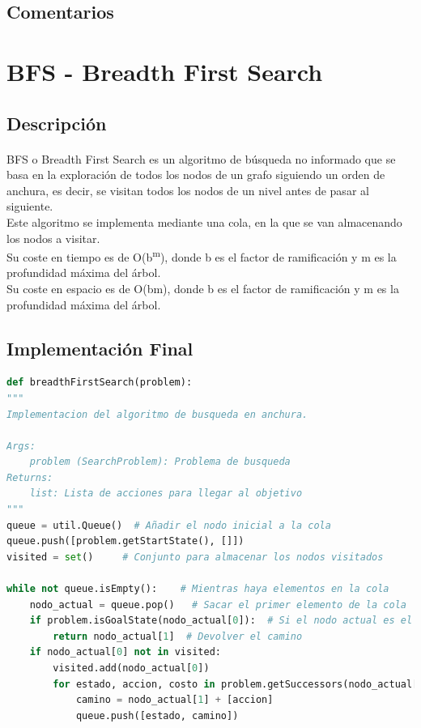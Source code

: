 \documentclass{report}
\begin{document}
        \subsection*{Comentarios}
          \paragraph*{}{

          }
      \clearpage\section{BFS - Breadth First Search}
        \subsection*{Descripción}
          \paragraph*{}{
            BFS o Breadth First Search es un algoritmo de búsqueda no informado que se basa en la exploración de todos los nodos de un grafo siguiendo un orden de anchura, es decir, se visitan todos los nodos de un nivel antes de pasar al siguiente.\\
            Este algoritmo se implementa mediante una cola, en la que se van almacenando los nodos a visitar.\\
            Su coste en tiempo es de O(b\textsuperscript{m}), donde b es el factor de ramificación y m es la profundidad máxima del árbol.\\
            Su coste en espacio es de O(bm), donde b es el factor de ramificación y m es la profundidad máxima del árbol.\\
          }
        \subsection*{Implementación Final}
          \begin{lstlisting}[language=Python, caption=Implementación final del BFS]
def breadthFirstSearch(problem):
"""
Implementacion del algoritmo de busqueda en anchura.

Args:
    problem (SearchProblem): Problema de busqueda
Returns:
    list: Lista de acciones para llegar al objetivo
"""
queue = util.Queue()  # Añadir el nodo inicial a la cola
queue.push([problem.getStartState(), []])
visited = set()     # Conjunto para almacenar los nodos visitados

while not queue.isEmpty():    # Mientras haya elementos en la cola
    nodo_actual = queue.pop()   # Sacar el primer elemento de la cola
    if problem.isGoalState(nodo_actual[0]):  # Si el nodo actual es el objetivo
        return nodo_actual[1]  # Devolver el camino
    if nodo_actual[0] not in visited:
        visited.add(nodo_actual[0])
        for estado, accion, costo in problem.getSuccessors(nodo_actual[0]): # Añadir los hijos del nodo actual a la cola
            camino = nodo_actual[1] + [accion]
            queue.push([estado, camino])
          \end{lstlisting}
\end{document}
